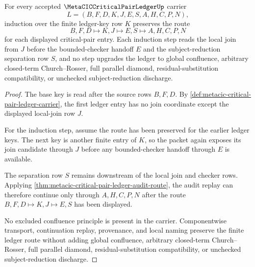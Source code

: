 \begin{theorem}
\label{thm:metacic-critical-pair-ledger-local-join-induction}
For every accepted $\MetaCICCriticalPairLedgerUp$ carrier
$$
L=(B,F,D,K,J,E,S,A,H,C,P,N),
$$
induction over the finite ledger-key row $K$ preserves the route
$$
B,F,D \longmapsto K,J \longmapsto E,S \longmapsto A,H,C,P,N
$$
for each displayed critical-pair entry. Each induction step reads the local join from $J$ before the bounded-checker handoff $E$ and the subject-reduction separation row $S$, and no step upgrades the ledger to global confluence, arbitrary closed-term Church--Rosser, full parallel diamond, residual-substitution compatibility, or unchecked subject-reduction discharge.
\end{theorem}
\begin{proof}
The base key is read after the source rows $B,F,D$. By \autoref{def:metacic-critical-pair-ledger-carrier}, the first ledger entry has no join coordinate except the displayed local-join row $J$.

For the induction step, assume the route has been preserved for the earlier ledger keys. The next key is another finite entry of $K$, so the packet again exposes its join candidate through $J$ before any bounded-checker handoff through $E$ is available.

The separation row $S$ remains downstream of the local join and checker rows. Applying \autoref{thm:metacic-critical-pair-ledger-audit-route}, the audit replay can therefore continue only through $A,H,C,P,N$ after the route $B,F,D \longmapsto K,J \longmapsto E,S$ has been displayed.

No excluded confluence principle is present in the carrier. Componentwise transport, continuation replay, provenance, and local naming preserve the finite ledger route without adding global confluence, arbitrary closed-term Church--Rosser, full parallel diamond, residual-substitution compatibility, or unchecked subject-reduction discharge.
\end{proof}



